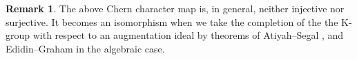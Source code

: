 \documentclass [11pt,oneside,a4paper,mathscr]{amsart}
\theoremstyle{definition}
\newtheorem{remark}[thm]{Remark}
\newcommand{\X}{\mathscr{X}}
\begin{document}
\begin{remark}
The above Chern character map is, in general, neither injective nor surjective. It becomes an isomorphism when we take the completion of the 
the K-group with respect to an augmentation ideal by theorems of Atiyah--Segal \cite{AtiyahSegal}, and Edidin--Graham \cite{EdidinGraham} in the algebraic case. 
\end{remark}
\end{document}
